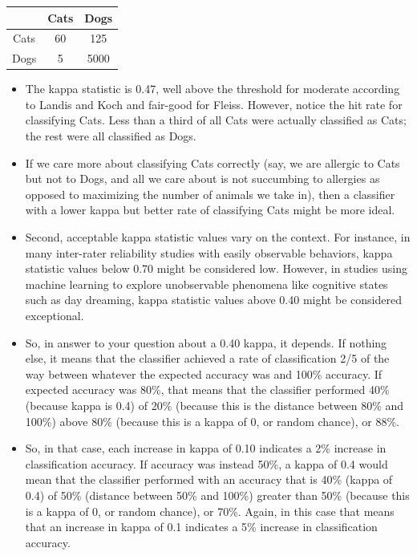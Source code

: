 \documentclass[caret-main.tex]{subfiles}
\begin{document}
\begin{center}
\begin{tabular}{|c|c|c|}
\hline 
    & Cats &Dogs \\ \hline
Cats& 60 & 125 \\ \hline
Dogs& 5 & 5000  \\ \hline
\end{tabular} 
\end{center} 

\begin{itemize}
\item The kappa statistic is 0.47, well above the threshold for moderate according to Landis and Koch and fair-good for Fleiss. However, notice the hit rate for classifying Cats. Less than a third of all Cats were actually classified as Cats; the rest were all classified as Dogs.
\item If we care more about classifying Cats correctly (say, we are allergic to Cats but not to Dogs, and all we care about is not succumbing to allergies as opposed to maximizing the number of animals we take in), then a classifier with a lower kappa but better rate of classifying Cats might be more ideal.

\item Second, acceptable kappa statistic values vary on the context. For instance, in many inter-rater reliability studies with easily observable behaviors, kappa statistic values below 0.70 might be considered low. However, in studies using machine learning to explore unobservable phenomena like cognitive states such as day dreaming, kappa statistic values above 0.40 might be considered exceptional.

\item So, in answer to your question about a 0.40 kappa, it depends. If nothing else, it means that the classifier achieved a rate of classification 2/5 of the way between whatever the expected accuracy was and 100\% accuracy. If expected accuracy was 80\%, that means that the classifier performed 40\% (because kappa is 0.4) of 20\% (because this is the distance between 80\% and 100\%) above 80\% (because this is a kappa of 0, or random chance), or 88\%.

\item So, in that case, each increase in kappa of 0.10 indicates a 2\% increase in classification accuracy. If accuracy was instead 50\%, a kappa of 0.4 would mean that the classifier performed with an accuracy that is 40\% (kappa of 0.4) of 50\% (distance between 50\% and 100\%) greater than 50\% (because this is a kappa of 0, or random chance), or 70\%. Again, in this case that means that an increase in kappa of 0.1 indicates a 5\% increase in classification accuracy.


\end{itemize}
\end{document}
